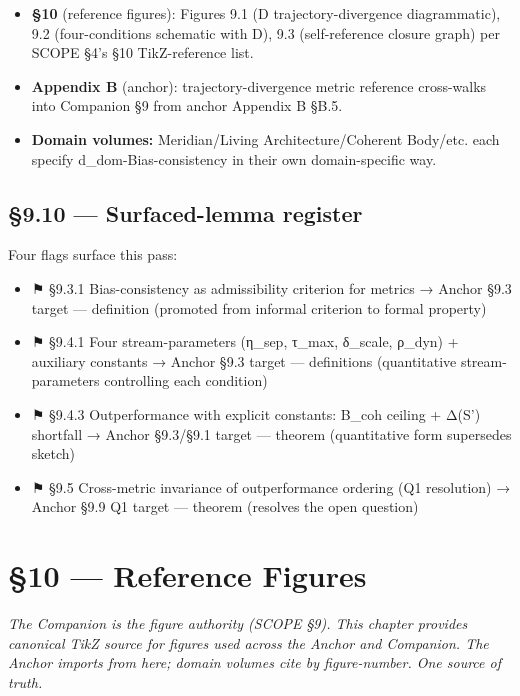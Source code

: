 \documentclass[11pt, openany]{book}
\newcommand{\sectionbreak}{\clearpage}
\begin{document}
\begin{itemize}
\item \textbf{§10} (reference figures): Figures 9.1 (D trajectory-divergence diagrammatic), 9.2 (four-conditions schematic with D), 9.3 (self-reference closure graph) per SCOPE §4's §10 TikZ-reference list.
\item \textbf{Appendix B} (anchor): trajectory-divergence metric reference cross-walks into Companion §9 from anchor Appendix B §B.5.
\item \textbf{Domain volumes:} Meridian/Living Architecture/Coherent Body/etc. each specify d\_\allowbreak{}dom-Bias-consistency in their own domain-specific way.
\end{itemize}

\sectionbreak

\section{§9.10 --- Surfaced-lemma register}

Four flags surface this pass:

\begin{itemize}
\item ⚑ §9.3.1 Bias-consistency as admissibility criterion for metrics → Anchor §9.3 target --- definition (promoted from informal criterion to formal property)
\item ⚑ §9.4.1 Four stream-parameters (η\_\allowbreak{}sep, τ\_\allowbreak{}max, δ\_\allowbreak{}scale, ρ\_\allowbreak{}dyn) + auxiliary constants → Anchor §9.3 target --- definitions (quantitative stream-parameters controlling each condition)
\item ⚑ §9.4.3 Outperformance with explicit constants: B\_\allowbreak{}coh ceiling + Δ(S') shortfall → Anchor §9.3/§9.1 target --- theorem (quantitative form supersedes sketch)
\item ⚑ §9.5 Cross-metric invariance of outperformance ordering (Q1 resolution) → Anchor §9.9 Q1 target --- theorem (resolves the open question)
\end{itemize}

\sectionbreak


\chapter{§10 — Reference Figures}


\textit{The Companion is the figure authority (SCOPE §9). This chapter provides canonical TikZ source for figures used across the Anchor and Companion. The Anchor imports from here; domain volumes cite by figure-number. One source of truth.}
\end{document}
